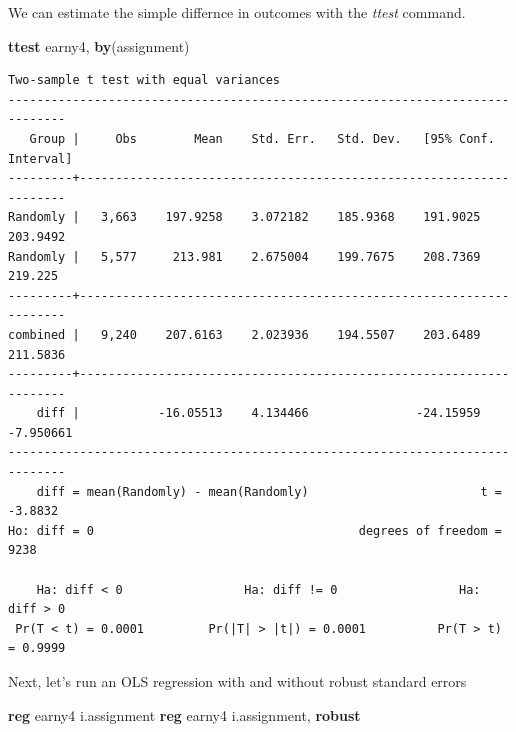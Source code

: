 \documentclass[
]{book}
\newenvironment{Shaded}{\begin{snugshade}}{\end{snugshade}}
\newcommand{\KeywordTok}[1]{\textcolor[rgb]{0.13,0.29,0.53}{\textbf{#1}}}
\newcommand{\NormalTok}[1]{#1}
\begin{document}
We can estimate the simple differnce in outcomes with the \emph{ttest} command.

\begin{Shaded}
\begin{Highlighting}[]
\KeywordTok{ttest}\NormalTok{ earny4, }\KeywordTok{by}\NormalTok{(assignment)}
\end{Highlighting}
\end{Shaded}

\begin{verbatim}
Two-sample t test with equal variances
------------------------------------------------------------------------------
   Group |     Obs        Mean    Std. Err.   Std. Dev.   [95% Conf. Interval]
---------+--------------------------------------------------------------------
Randomly |   3,663    197.9258    3.072182    185.9368    191.9025    203.9492
Randomly |   5,577     213.981    2.675004    199.7675    208.7369     219.225
---------+--------------------------------------------------------------------
combined |   9,240    207.6163    2.023936    194.5507    203.6489    211.5836
---------+--------------------------------------------------------------------
    diff |           -16.05513    4.134466               -24.15959   -7.950661
------------------------------------------------------------------------------
    diff = mean(Randomly) - mean(Randomly)                        t =  -3.8832
Ho: diff = 0                                     degrees of freedom =     9238

    Ha: diff < 0                 Ha: diff != 0                 Ha: diff > 0
 Pr(T < t) = 0.0001         Pr(|T| > |t|) = 0.0001          Pr(T > t) = 0.9999
\end{verbatim}

Next, let's run an OLS regression with and without robust standard errors

\begin{Shaded}
\begin{Highlighting}[]
\KeywordTok{reg}\NormalTok{ earny4 i.assignment}
\KeywordTok{reg}\NormalTok{ earny4 i.assignment, }\KeywordTok{robust}
\end{Highlighting}
\end{Shaded}
\end{document}
